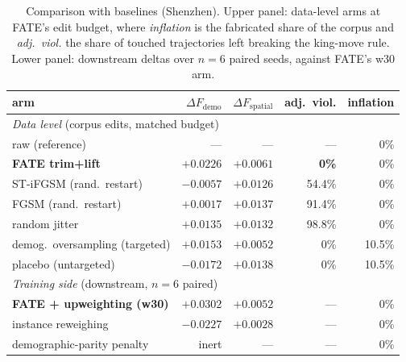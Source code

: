 \begin{table}[!ht]
\centering
\caption{Comparison with baselines (Shenzhen). Upper panel: data-level arms at
FATE's edit budget, where \emph{inflation} is the fabricated share of the corpus
and \emph{adj.\ viol.} the share of touched trajectories left breaking the
king-move rule. Lower panel: downstream deltas over $n = 6$ paired seeds,
against FATE's w30 arm.}
\label{tab:baselines}
\footnotesize
\setlength{\tabcolsep}{4pt}
\begin{tabular}{lrrrr}
\toprule
arm & $\Delta F_{\mathrm{demo}}$ & $\Delta F_{\mathrm{spatial}}$ & adj.\ viol. & inflation \\
\midrule
\multicolumn{5}{l}{\emph{Data level} (corpus edits, matched budget)} \\
raw (reference) & --- & --- & --- & 0\% \\
\textbf{FATE trim+lift} & $\mathbf{+0.0226}$ & $+0.0061$ & \textbf{0\%} & 0\% \\
ST-iFGSM (rand.\ restart) & $-0.0057$ & $+0.0126$ & 54.4\% & 0\% \\
FGSM (rand.\ restart) & $+0.0017$ & $+0.0137$ & 91.4\% & 0\% \\
random jitter & $+0.0135$ & $+0.0132$ & 98.8\% & 0\% \\
demog.\ oversampling (targeted) & $+0.0153$ & $+0.0052$ & 0\% & 10.5\% \\
\quad placebo (untargeted) & $-0.0172$ & $+0.0138$ & 0\% & 10.5\% \\
\midrule
\multicolumn{5}{l}{\emph{Training side} (downstream, $n = 6$ paired)} \\
\textbf{FATE + upweighting (w30)} & $\mathbf{+0.0302}$ & $+0.0052$ & --- & 0\% \\
instance reweighing & $-0.0227$ & $+0.0028$ & --- & 0\% \\
demographic-parity penalty & inert & --- & --- & 0\% \\
\bottomrule
\end{tabular}
\end{table}

